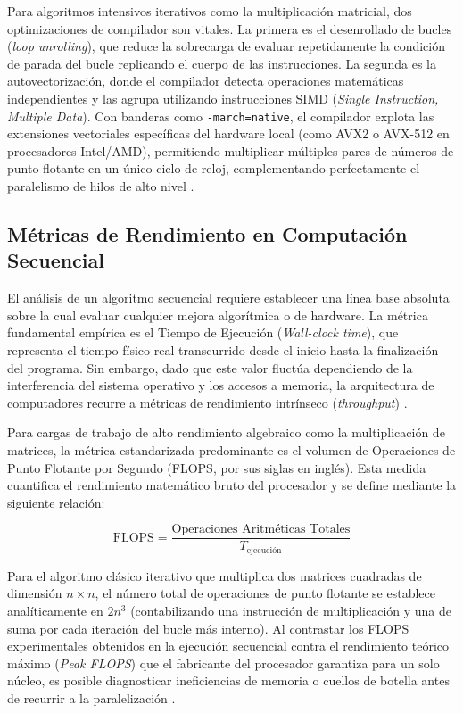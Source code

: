 Para algoritmos intensivos iterativos como la multiplicación matricial, dos optimizaciones de compilador son vitales. La primera es el desenrollado de bucles (\textit{loop unrolling}), que reduce la sobrecarga de evaluar repetidamente la condición de parada del bucle replicando el cuerpo de las instrucciones. La segunda es la autovectorización, donde el compilador detecta operaciones matemáticas independientes y las agrupa utilizando instrucciones SIMD (\textit{Single Instruction, Multiple Data}). Con banderas como \texttt{-march=native}, el compilador explota las extensiones vectoriales específicas del hardware local (como AVX2 o AVX-512 en procesadores Intel/AMD), permitiendo multiplicar múltiples pares de números de punto flotante en un único ciclo de reloj, complementando perfectamente el paralelismo de hilos de alto nivel \parencite{Patterson2017Computer}.

\subsection{Métricas de Rendimiento en Computación Secuencial}
El análisis de un algoritmo secuencial requiere establecer una línea base absoluta sobre la cual evaluar cualquier mejora algorítmica o de hardware. La métrica fundamental empírica es el Tiempo de Ejecución (\textit{Wall-clock time}), que representa el tiempo físico real transcurrido desde el inicio hasta la finalización del programa. Sin embargo, dado que este valor fluctúa dependiendo de la interferencia del sistema operativo y los accesos a memoria, la arquitectura de computadores recurre a métricas de rendimiento intrínseco (\textit{throughput}) \parencite{Patterson2017Computer}.

Para cargas de trabajo de alto rendimiento algebraico como la multiplicación de matrices, la métrica estandarizada predominante es el volumen de Operaciones de Punto Flotante por Segundo (FLOPS, por sus siglas en inglés). Esta medida cuantifica el rendimiento matemático bruto del procesador y se define mediante la siguiente relación:

\begin{equation}
    \text{FLOPS} = \frac{\text{Operaciones Aritméticas Totales}}{T_{\text{ejecución}}}
\end{equation}

Para el algoritmo clásico iterativo que multiplica dos matrices cuadradas de dimensión \(n \times n\), el número total de operaciones de punto flotante se establece analíticamente en \(2n^3\) (contabilizando una instrucción de multiplicación y una de suma por cada iteración del bucle más interno). Al contrastar los FLOPS experimentales obtenidos en la ejecución secuencial contra el rendimiento teórico máximo (\textit{Peak FLOPS}) que el fabricante del procesador garantiza para un solo núcleo, es posible diagnosticar ineficiencias de memoria o cuellos de botella antes de recurrir a la paralelización \parencite{Hager2010HPC}. 

